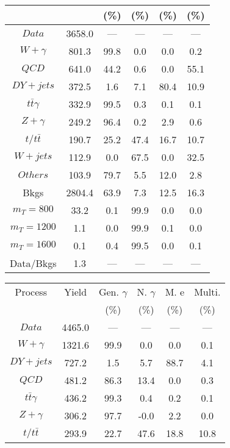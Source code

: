 \begin{figure}
\begin{minipage}[c]{0.32\textwidth}
{\begin{tabular}{cccccc}
 &  & (\%) & (\%) & (\%) & (\%)  \\
\hline
                                                                      $ Data $ &  3658.0 &  --- &  --- &  --- &  ---\\
$ W+\gamma $ &  801.3 &  99.8 &  0.0 &  0.0 &  0.2\\
$ QCD $ &  641.0 &  44.2 &  0.6 &  0.0 &  55.1\\
$ DY+jets $ &  372.5 &  1.6 &  7.1 &  80.4 &  10.9\\
$ t\bar{t}\gamma $ &  332.9 &  99.5 &  0.3 &  0.1 &  0.1\\
$ Z+\gamma $ &  249.2 &  96.4 &  0.2 &  2.9 &  0.6\\
$ t/t\bar{t} $ &  190.7 &  25.2 &  47.4 &  16.7 &  10.7\\
$ W+jets $ &  112.9 &  0.0 &  67.5 &  0.0 &  32.5\\
$ Others $ &  103.9 &  79.7 &  5.5 &  12.0 &  2.8\\
Bkgs &  2804.4 &  63.9 &  7.3 &  12.5 &  16.3\\
$ m_{T} = 800 $ &  33.2 &  0.1 &  99.9 &  0.0 &  0.0\\
$ m_{T} = 1200 $ &  1.1 &  0.0 &  99.9 &  0.1 &  0.0\\
$ m_{T} = 1600 $ &  0.1 &  0.4 &  99.5 &  0.0 &  0.1\\
Data/Bkgs &  1.3 &  --- &  --- &  --- &  ---\\
\hline
\end{tabular}
}
\end{minipage}
\begin{minipage}[c]{0.32\textwidth}
\centering
\tiny{
\begin{tabular}{cccccc}
\hline
Process & Yield & Gen. $\gamma$ & N. $\gamma$ & M. e & Multi. \\
 &  & (\%) & (\%) & (\%) & (\%)  \\
\hline
                                                                      $ Data $ &  4465.0 &  --- &  --- &  --- &  ---\\
$ W+\gamma $ &  1321.6 &  99.9 &  0.0 &  0.0 &  0.1\\
$ DY+jets $ &  727.2 &  1.5 &  5.7 &  88.7 &  4.1\\
$ QCD $ &  481.2 &  86.3 &  13.4 &  0.0 &  0.3\\
$ t\bar{t}\gamma $ &  436.2 &  99.3 &  0.4 &  0.2 &  0.1\\
$ Z+\gamma $ &  306.2 &  97.7 &  -0.0 &  2.2 &  0.0\\
$ t/t\bar{t} $ &  293.9 &  22.7 &  47.6 &  18.8 &  10.8\\

\end{tabular}}
\end{minipage}
\end{figure}
